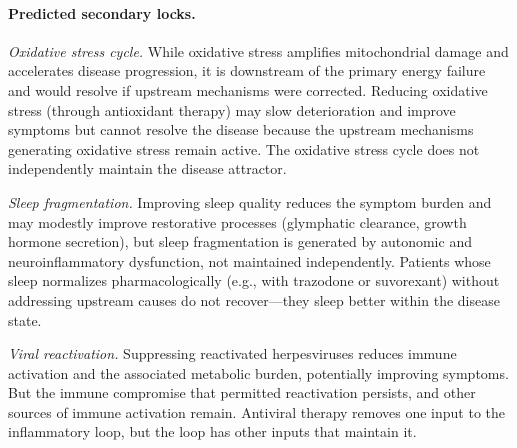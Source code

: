 \paragraph{Predicted secondary locks.}

\emph{Oxidative stress cycle.} While oxidative stress amplifies mitochondrial damage and accelerates disease progression, it is downstream of the primary energy failure and would resolve if upstream mechanisms were corrected. Reducing oxidative stress (through antioxidant therapy) may slow deterioration and improve symptoms but cannot resolve the disease because the upstream mechanisms generating oxidative stress remain active. The oxidative stress cycle does not independently maintain the disease attractor.

\emph{Sleep fragmentation.} Improving sleep quality reduces the symptom burden and may modestly improve restorative processes (glymphatic clearance, growth hormone secretion), but sleep fragmentation is generated by autonomic and neuroinflammatory dysfunction, not maintained independently. Patients whose sleep normalizes pharmacologically (e.g., with trazodone or suvorexant) without addressing upstream causes do not recover---they sleep better within the disease state.

\emph{Viral reactivation.} Suppressing reactivated herpesviruses reduces immune activation and the associated metabolic burden, potentially improving symptoms. But the immune compromise that permitted reactivation persists, and other sources of immune activation remain. Antiviral therapy removes one input to the inflammatory loop, but the loop has other inputs that maintain it.

